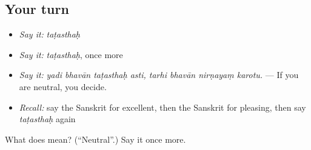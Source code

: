 \subsection*{Your turn}
\begin{itemize}
\raggedright
  \item \emph{Say it:} \emph{taṭasthaḥ}
  \item \emph{Say it:} \emph{taṭasthaḥ}, once more
  \item \emph{Say it:} \emph{yadi bhavān taṭasthaḥ asti, tarhi bhavān nirṇayaṃ karotu.} — If you are neutral, you decide.
  \item \emph{Recall:} say the Sanskrit for excellent, then the Sanskrit for pleasing, then say \emph{taṭasthaḥ} again
\end{itemize}

\begin{tcolorbox}[breakable,colback=teal!4,colframe=teal!35!black,title={Before you move on}]
What does  mean? (\textquotedblleft{}Neutral\textquotedblright{}.) Say it once more.
\end{tcolorbox}
